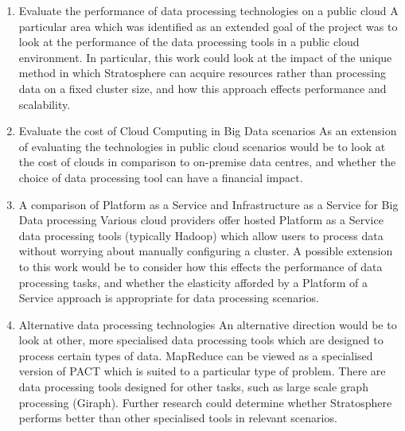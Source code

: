 \begin{enumerate}

\item Evaluate the performance of data processing technologies on a public cloud
A particular area which was identified as an extended goal of the project was to look at the performance of the data processing tools in a public cloud environment. In particular, this work could look at the impact of the unique method in which Stratosphere can acquire resources rather than processing data on a fixed cluster size, and how this approach effects performance and scalability. 

\item Evaluate the cost of Cloud Computing in Big Data scenarios
As an extension of evaluating the technologies in public cloud scenarios would be to look at the cost of clouds in comparison to on-premise data centres, and whether the choice of data processing tool can have a financial impact.

\item A comparison of Platform as a Service and Infrastructure as a Service for Big Data processing
Various cloud providers offer hosted Platform as a Service data processing tools (typically Hadoop) which allow users to process data without worrying about manually configuring a cluster. A possible extension to this work would be to consider how this effects the performance of data processing tasks, and whether the elasticity afforded by a Platform of a Service approach is appropriate for data processing scenarios. 

\item Alternative data processing technologies
An alternative direction would be to look at other, more specialised data processing tools which are designed to process certain types of data. MapReduce can be viewed as a specialised version of PACT which is suited to a particular type of problem. There are data processing tools designed for other tasks, such as large scale graph processing (Giraph). Further research could determine whether Stratosphere performs better than other specialised tools in relevant scenarios.
\end{enumerate}